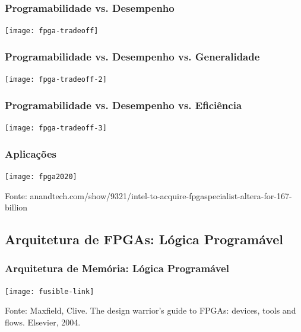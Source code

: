 \documentclass[10pt, compress]{beamer}
\begin{document}
\begin{frame}
    \frametitle{Programabilidade vs. Desempenho}
    \begin{center}
        \texttt{[image: fpga-tradeoff]}
    \end{center}
\end{frame}

\begin{frame}
    \frametitle{Programabilidade vs. Desempenho vs. Generalidade}
    \begin{center}
        \texttt{[image: fpga-tradeoff-2]}
    \end{center}
\end{frame}

\begin{frame}
    \frametitle{Programabilidade vs. Desempenho vs. Eficiência}
    \begin{center}
        \texttt{[image: fpga-tradeoff-3]}
    \end{center}
\end{frame}

\begin{frame}
    \frametitle{Aplicações}
    \begin{center}
        \texttt{[image: fpga2020]}
    \end{center}

    \vfill

    \begin{center}
        \scriptsize{Fonte: anandtech.com/show/9321/intel-to-acquire-fpgaspecialist-altera-for-167-billion}
    \end{center}
\end{frame}

\subsection{Arquitetura de FPGAs: Lógica Programável}

\begin{frame}
    \frametitle{Arquitetura de Memória: Lógica Programável}
    \begin{center}
        \texttt{[image: fusible-link]}
    \end{center}

    \vfill

    \begin{center}
        \scriptsize{Fonte: Maxfield, Clive. The design warrior's guide to FPGAs: devices, tools and flows. Elsevier, 2004.}
    \end{center}
\end{frame}
\end{document}
